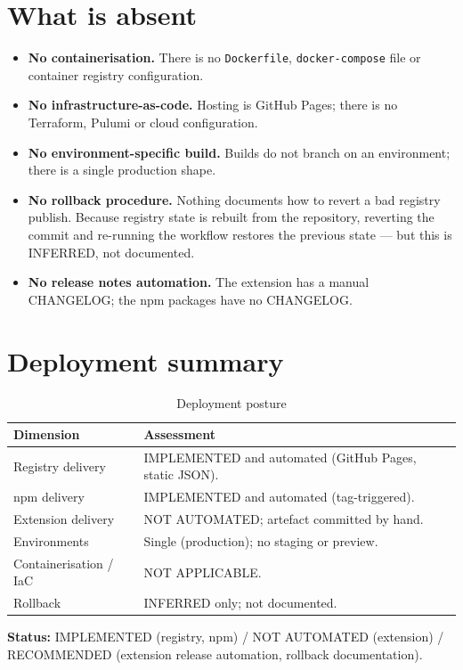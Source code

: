\section{What is absent}

\begin{itemize}
  \item \textbf{No containerisation.} There is no \texttt{Dockerfile},
        \texttt{docker-compose} file or container registry configuration.
  \item \textbf{No infrastructure-as-code.} Hosting is GitHub Pages; there is no
        Terraform, Pulumi or cloud configuration.
  \item \textbf{No environment-specific build.} Builds do not branch on an
        environment; there is a single production shape.
  \item \textbf{No rollback procedure.} Nothing documents how to revert a bad
        registry publish. Because registry state is rebuilt from the repository,
        reverting the commit and re-running the workflow restores the previous
        state --- but this is INFERRED, not documented.
  \item \textbf{No release notes automation.} The extension has a manual
        CHANGELOG; the npm packages have no CHANGELOG.
\end{itemize}

\section{Deployment summary}

\begin{table}[H]
\centering
\caption{Deployment posture}
\begin{tabular}{@{}L{4cm}L{10.2cm}@{}}
\toprule
\textbf{Dimension} & \textbf{Assessment} \\
\midrule
Registry delivery & IMPLEMENTED and automated (GitHub Pages, static JSON). \\
npm delivery & IMPLEMENTED and automated (tag-triggered). \\
Extension delivery & NOT AUTOMATED; artefact committed by hand. \\
Environments & Single (production); no staging or preview. \\
Containerisation / IaC & NOT APPLICABLE. \\
Rollback & INFERRED only; not documented. \\
\bottomrule
\end{tabular}
\end{table}

\textbf{Status:} IMPLEMENTED (registry, npm) / NOT AUTOMATED (extension) /
RECOMMENDED (extension release automation, rollback documentation).
